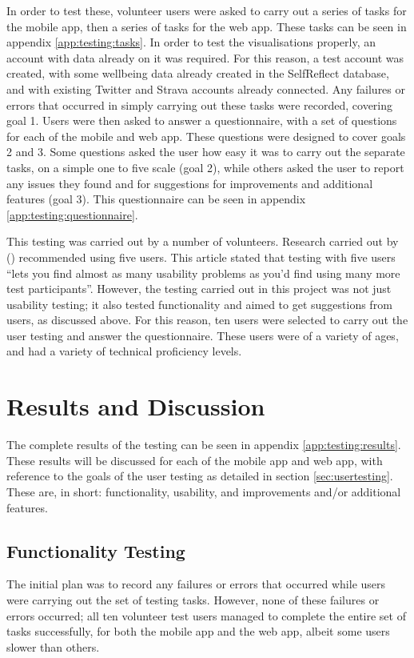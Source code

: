 \documentclass[11pt,openright,a4paper]{report}
\begin{document}
In order to test these, volunteer users were asked to carry out a series of tasks for the mobile app, then a series of tasks for the web app. These tasks can be seen in appendix \ref{app:testing:tasks}. In order to test the visualisations properly, an account with data already on it was required. For this reason, a test account was created, with some wellbeing data already created in the SelfReflect database, and with existing Twitter and Strava accounts already connected. Any failures or errors that occurred in simply carrying out these tasks were recorded, covering goal 1. Users were then asked to answer a questionnaire, with a set of questions for each of the mobile and web app. These questions were designed to cover goals 2 and 3. Some questions asked the user how easy it was to carry out the separate tasks, on a simple one to five scale (goal 2), while others asked the user to report any issues they found and for suggestions for improvements and additional features (goal 3). This questionnaire can be seen in appendix \ref{app:testing:questionnaire}.

This testing was carried out by a number of volunteers. Research carried out by \citeauthor{nielsenfiveusers} (\citeyear{nielsenfiveusers}) recommended using five users. This article stated that testing with five users \enquote{lets you find almost as many usability problems as you'd find using many more test participants}. However, the testing carried out in this project was not just usability testing; it also tested functionality and aimed to get suggestions from users, as discussed above. For this reason, ten users were selected to carry out the user testing and answer the questionnaire. These users were of a variety of ages, and had a variety of technical proficiency levels.

\chapter{Results and Discussion} \label{chap:results}
The complete results of the testing can be seen in appendix \ref{app:testing:results}. These results will be discussed for each of the mobile app and web app, with reference to the goals of the user testing as detailed in section \ref{sec:usertesting}. These are, in short: functionality, usability, and improvements and/or additional features.

\section{Functionality Testing}
The initial plan was to record any failures or errors that occurred while users were carrying out the set of testing tasks. However, none of these failures or errors occurred; all ten volunteer test users managed to complete the entire set of tasks successfully, for both the mobile app and the web app, albeit some users slower than others.
\end{document}

